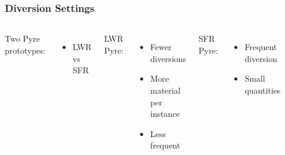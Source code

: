 \begin{frame}
\frametitle{Diversion Settings}
\begin{columns}
	\column[t]{4cm}
	Two Pyre prototypes:
	\begin{itemize}
		\item LWR vs SFR
	\end{itemize}
	LWR Pyre:
	\begin{itemize}
		\item Fewer diversions
		\item More material per instance
		\item Less frequent
	\end{itemize}
	SFR Pyre:
	\begin{itemize}
		\item Frequent diversion
		\item Small quantities
	\end{itemize}
	\column[t]{7cm}
	\begin{figure}
		\includegraphics[width=\linewidth]{images/divertmat}
	\end{figure}
\end{columns}
\end{frame}

